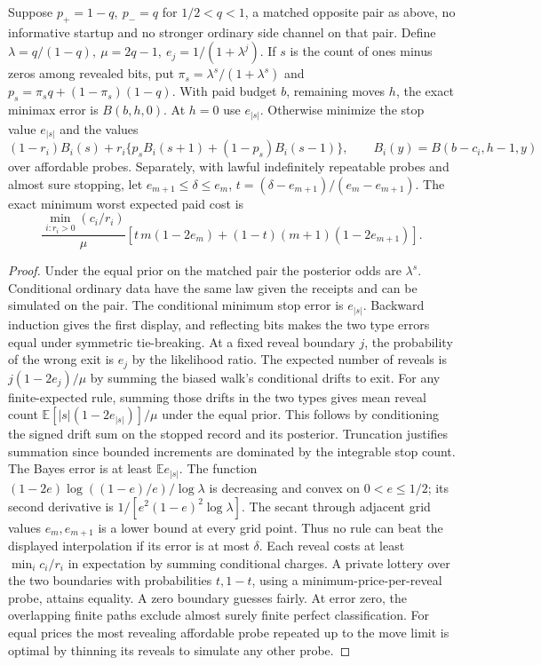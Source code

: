 \begin{theorem}\label{flag:a3}
Suppose \(p_+=1-q,\ p_-=q\) for \(1/2<q<1\), a matched opposite pair as above, no informative startup and no stronger ordinary side channel on that pair. Define \(\lambda=q/(1-q),\ \mu=2q-1,\ e_j=1/(1+\lambda^j)\). If \(s\) is the count of ones minus zeros among revealed bits, put \(\pi_s=\lambda^s/(1+\lambda^s)\) and \(p_s=\pi_s q+(1-\pi_s)(1-q)\). With paid budget \(b\), remaining moves \(h\), the exact minimax error is \(B(b,h,0)\). At \(h=0\) use \(e_{|s|}\). Otherwise minimize the stop value \(e_{|s|}\) and the values
\[
 (1-r_i)B_i(s)+r_i\{p_sB_i(s+1)+(1-p_s)B_i(s-1)\},
 \qquad B_i(y)=B(b-c_i,h-1,y)
\]
over affordable probes. Separately, with lawful indefinitely repeatable probes and almost sure stopping, let \(e_{m+1}\le\delta\le e_m\), \(t=(\delta-e_{m+1})/(e_m-e_{m+1})\). The exact minimum worst expected paid cost is
\[
 \frac{\min_{i:r_i>0}(c_i/r_i)}{\mu}
 \left[t\,m(1-2e_m)+(1-t)(m+1)(1-2e_{m+1})\right].
\]
\end{theorem}
\begin{proof}
Under the equal prior on the matched pair the posterior odds are \(\lambda^s\). Conditional ordinary data have the same law given the receipts and can be simulated on the pair. The conditional minimum stop error is \(e_{|s|}\). Backward induction gives the first display, and reflecting bits makes the two type errors equal under symmetric tie-breaking. At a fixed reveal boundary \(j\), the probability of the wrong exit is \(e_j\) by the likelihood ratio. The expected number of reveals is \(j(1-2e_j)/\mu\) by summing the biased walk's conditional drifts to exit. For any finite-expected rule, summing those drifts in the two types gives mean reveal count \(\mathbb E[|s|(1-2e_{|s|})]/\mu\) under the equal prior. This follows by conditioning the signed drift sum on the stopped record and its posterior. Truncation justifies summation since bounded increments are dominated by the integrable stop count. The Bayes error is at least \(\mathbb E e_{|s|}\). The function \((1-2e)\log((1-e)/e)/\log\lambda\) is decreasing and convex on \(0<e\le1/2\); its second derivative is \(1/[e^2(1-e)^2\log\lambda]\). The secant through adjacent grid values \(e_m,e_{m+1}\) is a lower bound at every grid point. Thus no rule can beat the displayed interpolation if its error is at most \(\delta\). Each reveal costs at least \(\min_i c_i/r_i\) in expectation by summing conditional charges. A private lottery over the two boundaries with probabilities \(t,1-t\), using a minimum-price-per-reveal probe, attains equality. A zero boundary guesses fairly. At error zero, the overlapping finite paths exclude almost surely finite perfect classification. For equal prices the most revealing affordable probe repeated up to the move limit is optimal by thinning its reveals to simulate any other probe.
\end{proof}

